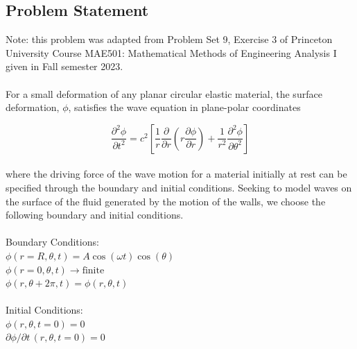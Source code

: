 \documentclass{homework}
\begin{document}
\newpage
\subsection{\textbf{Problem Statement}}
\noindent Note: this problem was adapted from Problem Set 9, Exercise 3 of Princeton University Course MAE501: Mathematical Methods of Engineering Analysis I given in Fall semester 2023.
\\ \\
\noindent For a small deformation of any planar circular elastic material, the surface deformation, $\phi$, satisfies the wave equation in plane-polar coordinates

\[ \frac{\partial^2 \phi}{\partial t^2} = c^2 \left[ \frac{1}{r} \frac{\partial}{\partial r} \left(r \frac{\partial \phi}{\partial r}\right) + \frac{1}{r^2} \frac{\partial^2 \phi}{\partial \theta^2} \right]\]
\\
\noindent where the driving force of the wave motion for a material initially at rest can be specified through the boundary and initial conditions. Seeking to model waves on the surface of the fluid generated by the motion of the walls, we choose the following boundary and initial conditions. \\ \\
\noindent Boundary Conditions: \\
$ \phi(r=R, \theta, t) = A \cos(\omega t) \cos (\theta) $ \\
$ \phi(r=0, \theta, t) \rightarrow \textrm{finite} $ \\
$ \phi(r, \theta + 2\pi, t) = \phi(r, \theta, t) $ \\ \\
\noindent Initial Conditions: \\
$ \phi(r, \theta, t=0) = 0 $ \\
$ \partial \phi/ \partial t \, (r, \theta, t=0) = 0 $
\end{document}
